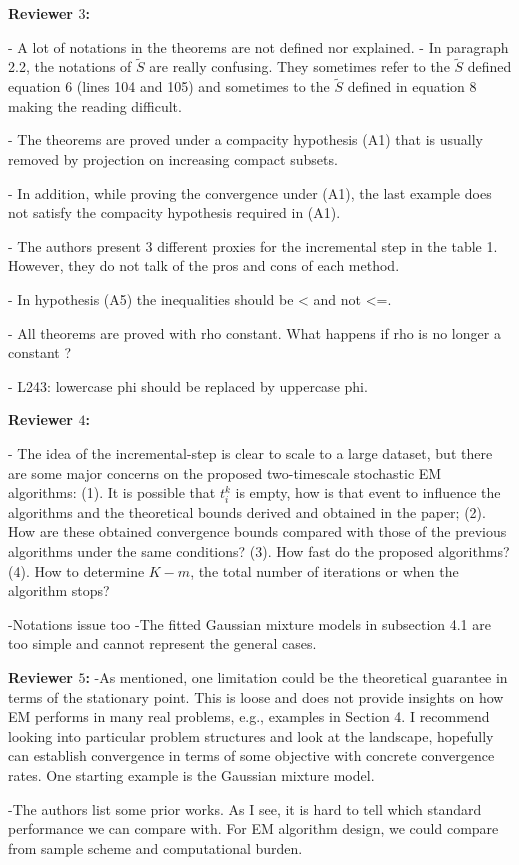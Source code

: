 \documentclass{article}
\begin{document}
\textbf{Reviewer $3$:}

- A lot of notations in the theorems are not defined nor explained. - In paragraph 2.2, the notations of $\tilde{S}$ are really confusing. They sometimes refer to the $\tilde{S}$ defined equation 6 (lines 104 and 105) and sometimes to the $\tilde{S}$ defined in equation 8 making the reading difficult. 

- The theorems are proved under a compacity hypothesis (A1) that is usually removed by projection on increasing compact subsets. 

- In addition, while proving the convergence under (A1), the last example does not satisfy the compacity hypothesis required in (A1). 

- The authors present 3 different proxies for the incremental step in the table 1. However, they do not talk of the pros and cons of each method.

- In hypothesis (A5) the inequalities should be < and not <=. 

- All theorems are proved with rho constant. What happens if rho is no longer a constant ? 

- L243: lowercase phi should be replaced by uppercase phi.

\textbf{Reviewer $4$:}

- The idea of the incremental-step is clear to scale to a large dataset, but there are some major concerns on the proposed two-timescale stochastic EM algorithms: 
(1). It is possible that $t_i^k$ is empty, how is that event to influence the algorithms and the theoretical bounds derived and obtained in the paper; 
(2). How are these obtained convergence bounds compared with those of the previous algorithms under the same conditions? 
(3). How fast do the proposed algorithms? 
(4). How to determine $K-m$, the total number of iterations or when the algorithm stops?

-Notations issue too
-The fitted Gaussian mixture models in subsection 4.1 are too simple and cannot represent the general cases.

\textbf{Reviewer $5$:}
-As mentioned, one limitation could be the theoretical guarantee in terms of the stationary point. This is loose and does not provide insights on how EM performs in many real problems, e.g., examples in Section 4. I recommend looking into particular problem structures and look at the landscape, hopefully can establish convergence in terms of some objective with concrete convergence rates. One starting example is the Gaussian mixture model.

-The authors list some prior works. As I see, it is hard to tell which standard performance we can compare with. For EM algorithm design, we could compare from sample scheme and computational burden.
\end{document}
